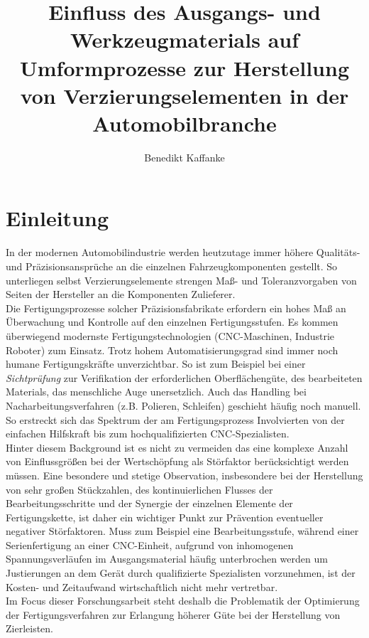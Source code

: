 \documentclass[12pt,a4paper,parskip]{scrartcl}
\begin{document}
\author{Benedikt Kaffanke}
\title{Einfluss des Ausgangs- und  Werkzeugmaterials auf Umformprozesse zur Herstellung von Verzierungselementen in der Automobilbranche}
\maketitle
\newpage
\tableofcontents
\newpage
\section{Einleitung}
In der modernen Automobilindustrie werden heutzutage immer höhere Qualitäts- und Präzisionsansprüche an die einzelnen Fahrzeugkomponenten  gestellt. So unterliegen selbst Verzierungselemente strengen Maß- und Toleranzvorgaben von Seiten der Hersteller an die Komponenten Zulieferer.\\
 Die Fertigungsprozesse solcher Präzisionsfabrikate erfordern ein hohes Maß an Überwachung und Kontrolle auf den einzelnen Fertigungsstufen. Es kommen überwiegend modernste Fertigungstechnologien (CNC-Maschinen, Industrie Roboter) zum Einsatz. Trotz hohem Automatisierungsgrad sind immer noch humane Fertigungskräfte unverzichtbar. So ist zum Beispiel bei einer \emph{Sichtprüfung} zur Verifikation der erforderlichen Oberflächengüte, des bearbeiteten Materials,  das menschliche Auge unersetzlich. Auch das Handling bei Nacharbeitungsverfahren (z.B. Polieren, Schleifen) geschieht häufig noch manuell. So  erstreckt sich das Spektrum der am Fertigungsprozess Involvierten von der einfachen Hilfskraft bis zum hochqualifizierten CNC-Spezialisten.\\
  Hinter diesem Background ist es nicht zu vermeiden das eine komplexe Anzahl von Einflussgrößen bei der Wertschöpfung als Störfaktor berücksichtigt werden müssen. Eine besondere und stetige Observation, insbesondere bei der Herstellung von sehr großen Stückzahlen,  des kontinuierlichen Flusses der Bearbeitungsschritte und der Synergie der einzelnen Elemente  der Fertigungskette, ist daher ein wichtiger Punkt zur Prävention eventueller negativer Störfaktoren. Muss zum Beispiel eine Bearbeitungsstufe, während einer Serienfertigung an einer CNC-Einheit,  aufgrund von inhomogenen Spannungsverläufen im Ausgangsmaterial häufig unterbrochen werden um Justierungen an dem Gerät durch   qualifizierte Spezialisten vorzunehmen,  ist der Kosten- und Zeitaufwand wirtschaftlich nicht mehr vertretbar.\\
     Im Focus dieser Forschungsarbeit steht deshalb die Problematik der Optimierung der Fertigungsverfahren zur Erlangung höherer Güte bei der Herstellung von Zierleisten.
 
\end{document}
